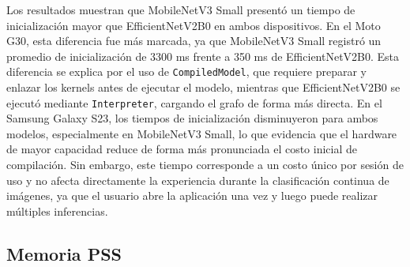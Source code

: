 \begin{table}[H]
    \centering
    \caption{Tiempo de inicialización y warmup en Samsung Galaxy S23.}
    \label{tab:samsung_init_warmup}
    \scriptsize
\end{table}

Los resultados muestran que MobileNetV3 Small presentó un tiempo de inicialización mayor que EfficientNetV2B0 en ambos dispositivos.
En el Moto G30, esta diferencia fue más marcada, ya que MobileNetV3 Small registró un promedio de inicialización de 3300 ms frente a
350 ms de EfficientNetV2B0. Esta diferencia se explica por el uso de \texttt{CompiledModel}, que requiere preparar y enlazar los
kernels antes de ejecutar el modelo, mientras que EfficientNetV2B0 se ejecutó mediante \texttt{Interpreter}, cargando el grafo de
forma más directa. En el Samsung Galaxy S23, los tiempos de inicialización disminuyeron para ambos modelos, especialmente en
MobileNetV3 Small, lo que evidencia que el hardware de mayor capacidad reduce de forma más pronunciada el costo inicial de
compilación. Sin embargo, este tiempo corresponde a un costo único por sesión de uso y no afecta directamente la experiencia durante
la clasificación continua de imágenes, ya que el usuario abre la aplicación una vez y luego puede realizar múltiples inferencias.


\subsection{Memoria PSS}

